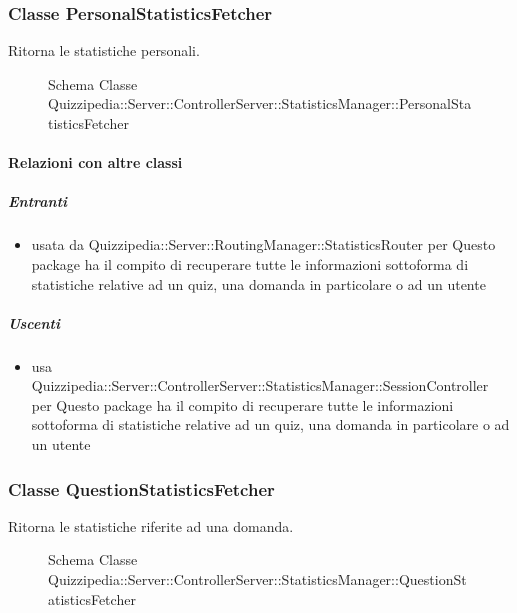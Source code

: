 \subsubsection{Classe PersonalStatisticsFetcher}
Ritorna le statistiche personali.
\begin{figure}[H]
\centering
\noindent{}
\caption[Schema Classe PersonalStatisticsFetcher]{Schema Classe Quizzipedia::Server::ControllerServer::StatisticsManager::PersonalStatisticsFetcher}
\end{figure}
\paragraph{Relazioni con altre classi}
\subparagraph{Entranti}
\begin{itemize}
\item usata da Quizzipedia::Server::RoutingManager::StatisticsRouter per Questo package ha il compito di recuperare tutte le informazioni sottoforma di statistiche relative ad un quiz, una domanda in particolare o ad un utente
\end{itemize}
\subparagraph{Uscenti}
\begin{itemize}
\item usa Quizzipedia::Server::ControllerServer::StatisticsManager::SessionController per Questo package ha il compito di recuperare tutte le informazioni sottoforma di statistiche relative ad un quiz, una domanda in particolare o ad un utente
\end{itemize}
\subsubsection{Classe QuestionStatisticsFetcher}
Ritorna le statistiche riferite ad una domanda.
\begin{figure}[H]
\centering
\noindent{}
\caption[Schema Classe QuestionStatisticsFetcher]{Schema Classe Quizzipedia::Server::ControllerServer::StatisticsManager::QuestionStatisticsFetcher}
\end{figure}
